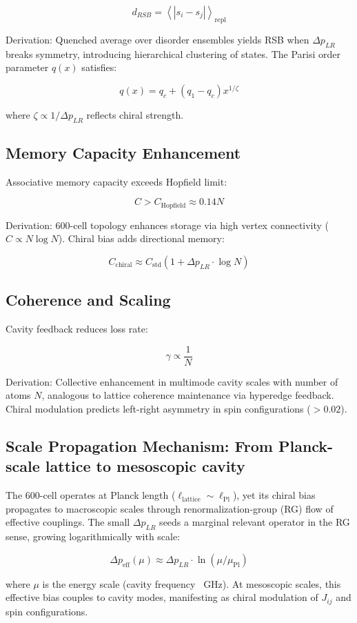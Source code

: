 \documentclass[11pt]{article}
\begin{document}
\[
d_{RSB} = \left\langle |s_i - s_j| \right\rangle_{\text{repl}}
\]

Derivation: Quenched average over disorder ensembles yields RSB when $\Delta p_{LR}$ breaks symmetry, introducing hierarchical clustering of states. The Parisi order parameter $q(x)$ satisfies:

\[
q(x) = q_c + (q_1 - q_c) x^{1/\zeta}
\]

where $\zeta \propto 1 / \Delta p_{LR}$ reflects chiral strength.

\subsection{Memory Capacity Enhancement}
Associative memory capacity exceeds Hopfield limit:

\[
C > C_{\text{Hopfield}} \approx 0.14 N
\]

Derivation: 600-cell topology enhances storage via high vertex connectivity ($C \propto N \log N$). Chiral bias adds directional memory:

\[
C_{\text{chiral}} \approx C_{\text{std}} (1 + \Delta p_{LR} \cdot \log N)
\]

\subsection{Coherence and Scaling}
Cavity feedback reduces loss rate:

\[
\gamma \propto \frac{1}{N}
\]

Derivation: Collective enhancement in multimode cavity scales with number of atoms $N$, analogous to lattice coherence maintenance via hyperedge feedback. Chiral modulation predicts left-right asymmetry in spin configurations ($> 0.02$).

\subsection{Scale Propagation Mechanism: From Planck-scale lattice to mesoscopic cavity}
The 600-cell operates at Planck length ($\ell_{\text{lattice}} \sim \ell_{\text{Pl}}$), yet its chiral bias propagates to macroscopic scales through renormalization-group (RG) flow of effective couplings. The small $\Delta p_{LR}$ seeds a marginal relevant operator in the RG sense, growing logarithmically with scale:

\[
\Delta p_{\text{eff}}(\mu) \approx \Delta p_{LR} \cdot \ln(\mu / \mu_{\text{Pl}})
\]

where $\mu$ is the energy scale (cavity frequency ~GHz). At mesoscopic scales, this effective bias couples to cavity modes, manifesting as chiral modulation of $J_{ij}$ and spin configurations.
\end{document}
